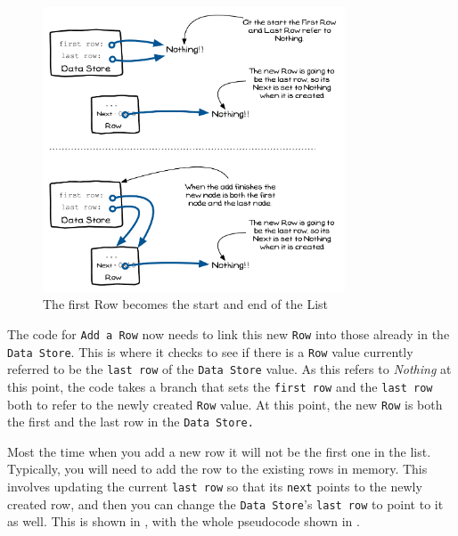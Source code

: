 \begin{figure}[htbp]
   \centering
   \includegraphics[width=0.80\textwidth]{./topics/dynamic-memory/diagrams/AddNode1} 
   \caption{The first Row becomes the start and end of the List}
   \label{fig:add-node-1}
\end{figure}

The code for \texttt{Add a Row} now needs to link this new \texttt{Row} into those already in the \texttt{Data Store}. This is where it checks to see if there is a \texttt{Row} value currently referred to be the \texttt{last row} of the \texttt{Data Store} value. As this refers to \emph{Nothing} at this point, the code takes a branch that sets the \texttt{first row} and the \texttt{last row} both to refer to the newly created \texttt{Row} value. At this point, the new \texttt{Row} is both the first and the last row in the \texttt{Data Store.}

\clearpage
Most the time when you add a new row it will not be the first one in the list. Typically, you will need to add the row to the existing rows in memory. This involves updating the current \texttt{last row} so that its \texttt{next} points to the newly created row, and then you can change the \texttt{Data Store}'s \texttt{last row} to point to it as well. This is shown in , with the whole pseudocode shown in .

